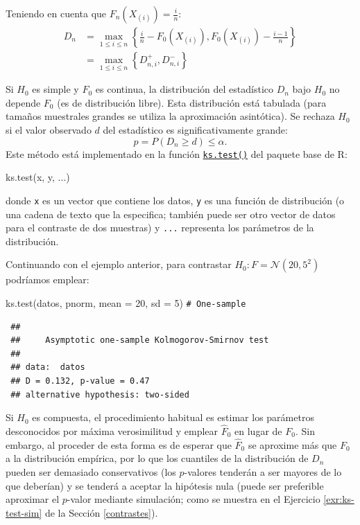 \documentclass[
  10pt,
]{book}
\newenvironment{Shaded}{\begin{snugshade}}{\end{snugshade}}
\newcommand{\AttributeTok}[1]{\textcolor[rgb]{0.77,0.63,0.00}{#1}}
\newcommand{\CommentTok}[1]{\textcolor[rgb]{0.56,0.35,0.01}{\textit{#1}}}
\newcommand{\DecValTok}[1]{\textcolor[rgb]{0.00,0.00,0.81}{#1}}
\newcommand{\FunctionTok}[1]{\textcolor[rgb]{0.00,0.00,0.00}{#1}}
\newcommand{\NormalTok}[1]{#1}
\theoremstyle{break}
\theoremstyle{nonumberplain}
\renewcommand{\CommentTok}[1]{\textcolor[rgb]{0.41,0.41,0.41}{\texttt{#1}}}
\begin{document}
Teniendo en cuenta que \(F_n\left( X_{(i)}\right) = \frac{i}n\):
\[\begin{aligned}
D_n  & =\max_{1\leq i\leq n}\left \{  \frac{i}n-F_0(X_{(i)}),F_0(X_{(i)})-\frac{i-1}n\right \} \\
& =\max_{1\leq i\leq n}\left \{  D_{n,i}^{+},D_{n,i}^{-}\right \}
\end{aligned}\]

Si \(H_0\) es simple y \(F_0\) es continua, la distribución del estadístico \(D_n\) bajo \(H_0\) no depende \(F_0\) (es de distribución libre).
Esta distribución está tabulada (para tamaños muestrales grandes se utiliza la aproximación asintótica).
Se rechaza \(H_0\) si el valor observado \(d\) del estadístico es significativamente grande:
\[p = P \left( D_n \geq d \right) \leq \alpha.\]
Este método está implementado en la función \href{https://rdrr.io/r/stats/ks.test.html}{\texttt{ks.test()}} del paquete base de R:

\begin{Shaded}
\begin{Highlighting}[]
\FunctionTok{ks.test}\NormalTok{(x, y, ...)}
\end{Highlighting}
\end{Shaded}

donde \texttt{x} es un vector que contiene los datos, \texttt{y} es una función de distribución
(o una cadena de texto que la especifica; también puede ser otro vector de datos
para el contraste de dos muestras) y \texttt{...} representa los parámetros de la distribución.

Continuando con el ejemplo anterior, para contrastar \(H_0:F= \mathcal{N}(20,5^2)\) podríamos emplear:

\begin{Shaded}
\begin{Highlighting}[]
\FunctionTok{ks.test}\NormalTok{(datos, pnorm, }\AttributeTok{mean =} \DecValTok{20}\NormalTok{, }\AttributeTok{sd =} \DecValTok{5}\NormalTok{) }\CommentTok{\# One{-}sample }
\end{Highlighting}
\end{Shaded}

\begin{verbatim}
 ## 
 ##     Asymptotic one-sample Kolmogorov-Smirnov test
 ## 
 ## data:  datos
 ## D = 0.132, p-value = 0.47
 ## alternative hypothesis: two-sided
\end{verbatim}

Si \(H_0\) es compuesta, el procedimiento habitual es estimar los parámetros desconocidos
por máxima verosimilitud y emplear \(\hat{F}_0\) en lugar de \(F_0\).
Sin embargo, al proceder de esta forma es de esperar que \(\hat{F}_0\) se aproxime más
que \(F_0\) a la distribución empírica, por lo que los cuantiles de la distribución de
\(D_n\) pueden ser demasiado conservativos (los \(p\)-valores tenderán a ser mayores de
lo que deberían) y se tenderá a aceptar la hipótesis nula (puede ser preferible aproximar el \(p\)-valor mediante simulación; como se muestra en el Ejercicio \ref{exr:ks-test-sim} de la Sección \ref{contrastes}).
\end{document}
